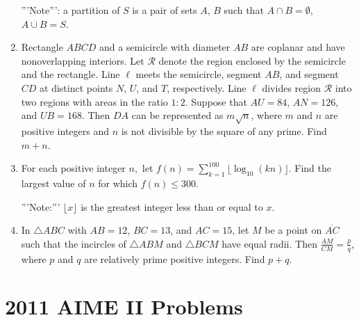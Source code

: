 \documentclass{article}
\begin{document}
\begin{enumerate}[label=\arabic*., itemsep=0.5em]
'''Note''': a partition of \(S\) is a pair of sets \(A\), \(B\) such that \(A \cap B = \emptyset\), \(A \cup B = S\).\par \vspace{0.5em}\item Rectangle \(ABCD\) and a semicircle with diameter \(AB\) are coplanar and have nonoverlapping interiors. Let \(\mathcal{R}\) denote the region enclosed by the semicircle and the rectangle. Line \(\ell\) meets the semicircle, segment \(AB\), and segment \(CD\) at distinct points \(N\), \(U\), and \(T\), respectively. Line \(\ell\) divides region \(\mathcal{R}\) into two regions with areas in the ratio \(1: 2\). Suppose that \(AU = 84\), \(AN = 126\), and \(UB = 168\). Then \(DA\) can be represented as \(m\sqrt {n}\), where \(m\) and \(n\) are positive integers and \(n\) is not divisible by the square of any prime. Find \(m + n\).\par \vspace{0.5em}\item For each positive integer \(n,\) let \(f(n) = \sum_{k = 1}^{100} \lfloor \log_{10} (kn) \rfloor\). Find the largest value of \(n\) for which \(f(n) \le 300\).

'''Note:''' \(\lfloor x \rfloor\) is the greatest integer less than or equal to \(x\).\par \vspace{0.5em}\item In \(\triangle{ABC}\) with \(AB = 12\), \(BC = 13\), and \(AC = 15\), let \(M\) be a point on \(\overline{AC}\) such that the incircles of \(\triangle{ABM}\) and \(\triangle{BCM}\) have equal radii. Then \(\frac{AM}{CM} = \frac{p}{q}\), where \(p\) and \(q\) are relatively prime positive integers. Find \(p + q\).\par \vspace{0.5em}\end{enumerate}\newpage\section*{2011 AIME II Problems}
\end{document}
